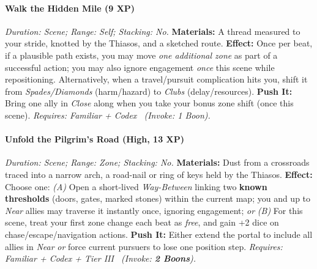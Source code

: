 \documentclass[12pt,twoside]{book}
\begin{document}
\paragraph{Walk the Hidden Mile (9 XP)} \emph{Duration: Scene; Range: Self; Stacking: No.}
\textbf{Materials:} A thread measured to your stride, knotted by the Thiasos, and a sketched route.
\textbf{Effect:} Once per beat, if a plausible path exists, you may move \emph{one additional zone} as part of a successful action; you may also ignore engagement \emph{once} this scene while repositioning. Alternatively, when a travel/pursuit complication hits you, shift it from \emph{Spades/Diamonds} (harm/hazard) to \emph{Clubs} (delay/resources).
\textbf{Push It:} Bring one ally in \emph{Close} along when you take your bonus zone shift (once this scene).
\emph{Requires: Familiar + Codex \ (\textit{Invoke:} 1 Boon).}
\paragraph{Unfold the Pilgrim's Road (High, 13 XP)} \emph{Duration: Scene; Range: Zone; Stacking: No.}
\textbf{Materials:} Dust from a crossroads traced into a narrow arch, a road-nail or ring of keys held by the Thiasos.
\textbf{Effect:} Choose one: 
\emph{(A)} Open a short-lived \emph{Way-Between} linking two \textbf{known thresholds} (doors, gates, marked stones) within the current map; you and up to \emph{Near} allies may traverse it instantly once, ignoring engagement; \emph{or} 
\emph{(B)} For this scene, treat your first zone change each beat as \emph{free}, and gain +2 dice on chase/escape/navigation actions.
\textbf{Push It:} Either extend the portal to include all allies in \emph{Near} \emph{or} force current pursuers to lose one position step.
\emph{Requires: Familiar + Codex + Tier III \ (\textit{Invoke:} \textbf{2 Boons}).}
\end{document}
